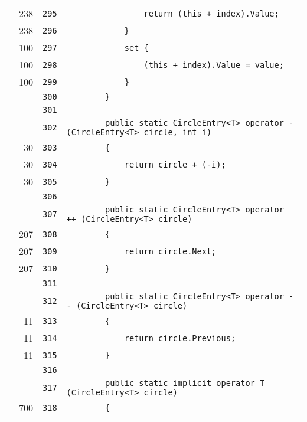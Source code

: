 \documentclass[a4paper,10pt]{article}
\begin{document}
\begin{longtable}[l]{lrrl}
\cellcolor{green} & 238 & \verb~295~ & \verb~                return (this + index).Value;~\\
\cellcolor{green} & 238 & \verb~296~ & \verb~            }~\\
\cellcolor{green} & 100 & \verb~297~ & \verb~            set {~\\
\cellcolor{green} & 100 & \verb~298~ & \verb~                (this + index).Value = value;~\\
\cellcolor{green} & 100 & \verb~299~ & \verb~            }~\\
\cellcolor{gray} &  & \verb~300~ & \verb~        }~\\
\cellcolor{gray} &  & \verb~301~ & \verb~~\\
\cellcolor{gray} &  & \verb~302~ & \verb~        public static CircleEntry<T> operator - (CircleEntry<T> circle, int i)~\\
\cellcolor{green} & 30 & \verb~303~ & \verb~        {~\\
\cellcolor{green} & 30 & \verb~304~ & \verb~            return circle + (-i);~\\
\cellcolor{green} & 30 & \verb~305~ & \verb~        }~\\
\cellcolor{gray} &  & \verb~306~ & \verb~~\\
\cellcolor{gray} &  & \verb~307~ & \verb~        public static CircleEntry<T> operator ++ (CircleEntry<T> circle)~\\
\cellcolor{green} & 207 & \verb~308~ & \verb~        {~\\
\cellcolor{green} & 207 & \verb~309~ & \verb~            return circle.Next;~\\
\cellcolor{green} & 207 & \verb~310~ & \verb~        }~\\
\cellcolor{gray} &  & \verb~311~ & \verb~~\\
\cellcolor{gray} &  & \verb~312~ & \verb~        public static CircleEntry<T> operator -- (CircleEntry<T> circle)~\\
\cellcolor{green} & 11 & \verb~313~ & \verb~        {~\\
\cellcolor{green} & 11 & \verb~314~ & \verb~            return circle.Previous;~\\
\cellcolor{green} & 11 & \verb~315~ & \verb~        }~\\
\cellcolor{gray} &  & \verb~316~ & \verb~~\\
\cellcolor{gray} &  & \verb~317~ & \verb~        public static implicit operator T (CircleEntry<T> circle)~\\
\cellcolor{green} & 700 & \verb~318~ & \verb~        {~\\

\end{longtable}
\end{document}
